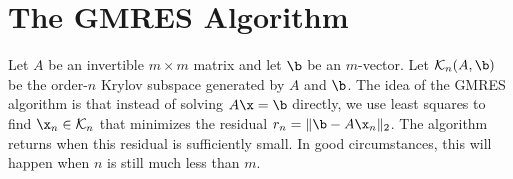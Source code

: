 \section*{The GMRES Algorithm} %

Let $A$ be an invertible $m \times m$ matrix and let $\b$ be an $m$-vector.
Let $\mathcal{K}_n(A, \b)$ be the order-$n$ Krylov subspace generated by $A$ and $\b$.
The idea of the GMRES algorithm is that instead of solving $A\x = \b$ directly, we use least squares to find $\x_n \in \mathcal{K}_n$ that minimizes the residual $r_n = \|\b - A\x_n\|_2$.
The algorithm returns when this residual is sufficiently small.
In good circumstances, this will happen when $n$ is still much less than $m$.

